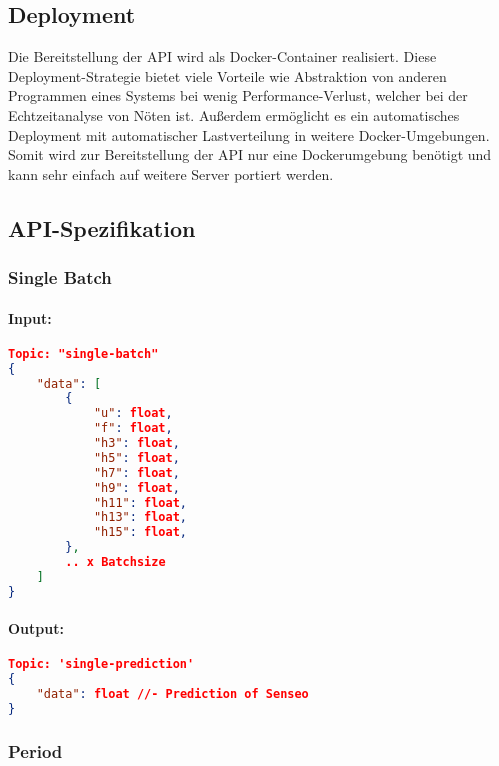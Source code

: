     \subsection{Deployment}
        Die Bereitstellung der API wird als Docker-Container realisiert.
        Diese Deployment-Strategie bietet viele Vorteile wie Abstraktion von anderen Programmen eines Systems bei wenig Performance-Verlust, welcher bei der Echtzeitanalyse von Nöten ist.
        Außerdem ermöglicht es ein automatisches Deployment mit automatischer Lastverteilung in weitere Docker-Umgebungen.
        Somit wird zur Bereitstellung der API nur eine Dockerumgebung benötigt und kann sehr einfach auf weitere Server portiert werden.
                

    \subsection{API-Spezifikation}\label{API-Spezifikation}
        \subsubsection{Single Batch}
        \paragraph{Input:}

            \begin{lstlisting}[language=json,firstnumber=1]
Topic: "single-batch"
{
    "data": [
        {
            "u": float,
            "f": float,
            "h3": float,
            "h5": float,
            "h7": float,
            "h9": float,
            "h11": float,
            "h13": float,
            "h15": float,
        },
        .. x Batchsize
    ]
}
            \end{lstlisting}
        
            \paragraph{Output:}
        
            \begin{lstlisting}[language=json,firstnumber=1]
Topic: 'single-prediction'
{
    "data": float //- Prediction of Senseo
}
            \end{lstlisting}
    
        \subsubsection{Period}
